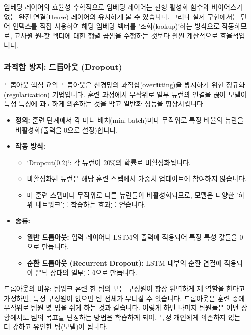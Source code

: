 \documentclass[11pt,a4paper]{article}
\begin{document}
\begin{cautionbox}{임베딩 레이어의 효율성}
수학적으로 임베딩 레이어는 선형 활성화 함수와 바이어스가 없는 완전 연결(Dense) 레이어와 유사하게 볼 수 있습니다. 그러나 실제 구현에서는 단어 인덱스를 직접 사용하여 해당 임베딩 벡터를 '조회(lookup)'하는 방식으로 작동하므로, 고차원 원-핫 벡터에 대한 행렬 곱셈을 수행하는 것보다 훨씬 계산적으로 효율적입니다.
\end{cautionbox}

\subsubsection{과적합 방지: 드롭아웃 (Dropout)}
\begin{summarybox}{드롭아웃 핵심 요약}
드롭아웃은 신경망의 과적합(overfitting)을 방지하기 위한 정규화(regularization) 기법입니다. 훈련 과정에서 무작위로 일부 뉴런의 연결을 끊어 모델이 특정 특징에 과도하게 의존하는 것을 막고 일반화 성능을 향상시킵니다.
\end{summarybox}

\begin{itemize}
    \item \textbf{정의:} 훈련 단계에서 각 미니 배치(mini-batch)마다 무작위로 특정 비율의 뉴런을 비활성화(출력을 0으로 설정)합니다.
    \item \textbf{작동 방식:}
        \begin{itemize}
            \item `Dropout(0.2)`: 각 뉴런이 20\%의 확률로 비활성화됩니다.
            \item 비활성화된 뉴런은 해당 훈련 스텝에서 가중치 업데이트에 참여하지 않습니다.
            \item 매 훈련 스텝마다 무작위로 다른 뉴런들이 비활성화되므로, 모델은 다양한 '하위 네트워크'를 학습하는 효과를 얻습니다.
        \end{itemize}
    \item \textbf{종류:}
        \begin{itemize}
            \item \textbf{일반 드롭아웃:} 입력 레이어나 LSTM의 출력에 적용되어 특정 특성 값들을 0으로 만듭니다.
            \item \textbf{순환 드롭아웃 (Recurrent Dropout):} LSTM 내부의 순환 연결에 적용되어 은닉 상태의 일부를 0으로 만듭니다.
        \end{itemize}
\end{itemize}

\begin{examplebox}{드롭아웃의 비유: 팀워크 훈련}
한 팀의 모든 구성원이 항상 완벽하게 제 역할을 한다고 가정하면, 특정 구성원이 없으면 팀 전체가 무너질 수 있습니다. 드롭아웃은 훈련 중에 무작위로 팀원 몇 명을 쉬게 하는 것과 같습니다. 이렇게 하면 나머지 팀원들은 어떤 상황에서도 팀의 목표를 달성하는 방법을 학습하게 되어, 특정 개인에게 의존하지 않는 더 강하고 유연한 팀(모델)이 됩니다.
\end{examplebox}
\end{document}
